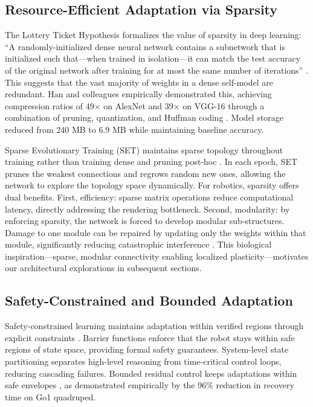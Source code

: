 \documentclass[12pt,a4paper,oneside]{report}
\begin{document}
\subsection{Resource-Efficient Adaptation via Sparsity}

The Lottery Ticket Hypothesis formalizes the value of sparsity in deep learning: ``A randomly-initialized dense neural network contains a subnetwork that is initialized such that---when trained in isolation---it can match the test accuracy of the original network after training for at most the same number of iterations'' \cite{frankle2018lottery}. This suggests that the vast majority of weights in a dense self-model are redundant. Han and colleagues empirically demonstrated this, achieving compression ratios of 49$\times$ on AlexNet and 39$\times$ on VGG-16 through a combination of pruning, quantization, and Huffman coding \cite{han2015deep}. Model storage reduced from 240 MB to 6.9 MB while maintaining baseline accuracy.

Sparse Evolutionary Training (SET) maintains sparse topology throughout training rather than training dense and pruning post-hoc \cite{mocanu2018scalable}. In each epoch, SET prunes the weakest connections and regrows random new ones, allowing the network to explore the topology space dynamically. For robotics, sparsity offers dual benefits. First, efficiency: sparse matrix operations reduce computational latency, directly addressing the rendering bottleneck. Second, modularity: by enforcing sparsity, the network is forced to develop modular sub-structures. Damage to one module can be repaired by updating only the weights within that module, significantly reducing catastrophic interference \cite{frankle2018lottery, mocanu2018scalable}. This biological inspiration---sparse, modular connectivity enabling localized plasticity---motivates our architectural explorations in subsequent sections.

\subsection{Safety-Constrained and Bounded Adaptation}

Safety-constrained learning maintains adaptation within verified regions through explicit constraints \cite{brunke2021safe, meng2026riskbounded}. Barrier functions enforce that the robot stays within safe regions of state space, providing formal safety guarantees. System-level state partitioning separates high-level reasoning from time-critical control loops, reducing cascading failures. Bounded residual control keeps adaptations within safe envelopes \cite{jayasinghe2026residual}, as demonstrated empirically by the 96\% reduction in recovery time on Go1 quadruped.
\end{document}
